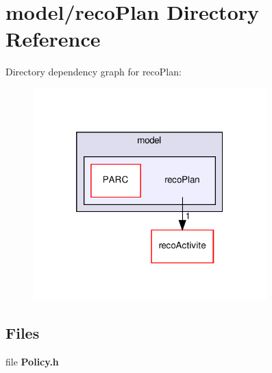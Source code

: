 \section{model/reco\+Plan Directory Reference}
\label{dir_1cf490a07e882eb28a8f3668eb2b06de}
Directory dependency graph for reco\+Plan\+:
\nopagebreak
\begin{figure}[H]
\begin{center}
\leavevmode
\includegraphics[width=256pt]{dir_1cf490a07e882eb28a8f3668eb2b06de_dep}
\end{center}
\end{figure}
\subsection*{Files}
\begin{DoxyCompactItemize}
\item 
file \textbf{ Policy.\+h}
\end{DoxyCompactItemize}
